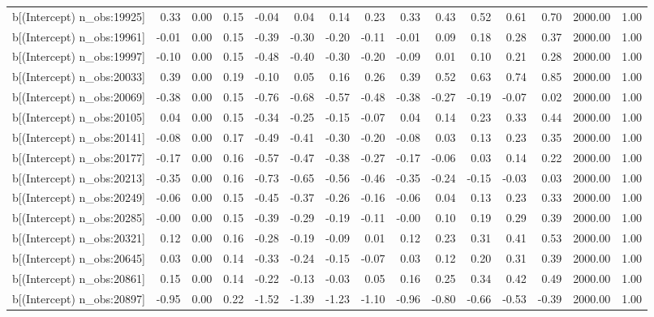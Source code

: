 \begin{table}[ht]
\begin{tabular}{rrrrrrrrrrrrrrr}
  b[(Intercept) n\_obs:19925] & 0.33 & 0.00 & 0.15 & -0.04 & 0.04 & 0.14 & 0.23 & 0.33 & 0.43 & 0.52 & 0.61 & 0.70 & 2000.00 & 1.00 \\ 
  b[(Intercept) n\_obs:19961] & -0.01 & 0.00 & 0.15 & -0.39 & -0.30 & -0.20 & -0.11 & -0.01 & 0.09 & 0.18 & 0.28 & 0.37 & 2000.00 & 1.00 \\ 
  b[(Intercept) n\_obs:19997] & -0.10 & 0.00 & 0.15 & -0.48 & -0.40 & -0.30 & -0.20 & -0.09 & 0.01 & 0.10 & 0.21 & 0.28 & 2000.00 & 1.00 \\ 
  b[(Intercept) n\_obs:20033] & 0.39 & 0.00 & 0.19 & -0.10 & 0.05 & 0.16 & 0.26 & 0.39 & 0.52 & 0.63 & 0.74 & 0.85 & 2000.00 & 1.00 \\ 
  b[(Intercept) n\_obs:20069] & -0.38 & 0.00 & 0.15 & -0.76 & -0.68 & -0.57 & -0.48 & -0.38 & -0.27 & -0.19 & -0.07 & 0.02 & 2000.00 & 1.00 \\ 
  b[(Intercept) n\_obs:20105] & 0.04 & 0.00 & 0.15 & -0.34 & -0.25 & -0.15 & -0.07 & 0.04 & 0.14 & 0.23 & 0.33 & 0.44 & 2000.00 & 1.00 \\ 
  b[(Intercept) n\_obs:20141] & -0.08 & 0.00 & 0.17 & -0.49 & -0.41 & -0.30 & -0.20 & -0.08 & 0.03 & 0.13 & 0.23 & 0.35 & 2000.00 & 1.00 \\ 
  b[(Intercept) n\_obs:20177] & -0.17 & 0.00 & 0.16 & -0.57 & -0.47 & -0.38 & -0.27 & -0.17 & -0.06 & 0.03 & 0.14 & 0.22 & 2000.00 & 1.00 \\ 
  b[(Intercept) n\_obs:20213] & -0.35 & 0.00 & 0.16 & -0.73 & -0.65 & -0.56 & -0.46 & -0.35 & -0.24 & -0.15 & -0.03 & 0.03 & 2000.00 & 1.00 \\ 
  b[(Intercept) n\_obs:20249] & -0.06 & 0.00 & 0.15 & -0.45 & -0.37 & -0.26 & -0.16 & -0.06 & 0.04 & 0.13 & 0.23 & 0.33 & 2000.00 & 1.00 \\ 
  b[(Intercept) n\_obs:20285] & -0.00 & 0.00 & 0.15 & -0.39 & -0.29 & -0.19 & -0.11 & -0.00 & 0.10 & 0.19 & 0.29 & 0.39 & 2000.00 & 1.00 \\ 
  b[(Intercept) n\_obs:20321] & 0.12 & 0.00 & 0.16 & -0.28 & -0.19 & -0.09 & 0.01 & 0.12 & 0.23 & 0.31 & 0.41 & 0.53 & 2000.00 & 1.00 \\ 
  b[(Intercept) n\_obs:20645] & 0.03 & 0.00 & 0.14 & -0.33 & -0.24 & -0.15 & -0.07 & 0.03 & 0.12 & 0.20 & 0.31 & 0.39 & 2000.00 & 1.00 \\ 
  b[(Intercept) n\_obs:20861] & 0.15 & 0.00 & 0.14 & -0.22 & -0.13 & -0.03 & 0.05 & 0.16 & 0.25 & 0.34 & 0.42 & 0.49 & 2000.00 & 1.00 \\ 
  b[(Intercept) n\_obs:20897] & -0.95 & 0.00 & 0.22 & -1.52 & -1.39 & -1.23 & -1.10 & -0.96 & -0.80 & -0.66 & -0.53 & -0.39 & 2000.00 & 1.00 \\ 

\end{tabular}
\end{table}
